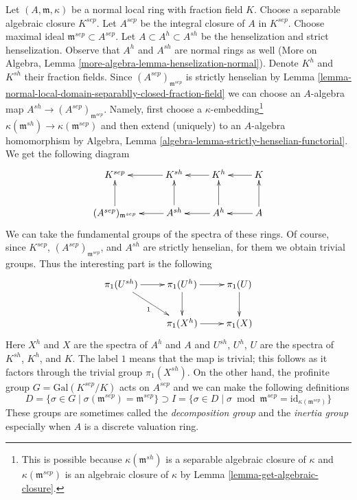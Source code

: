 \documentclass{stacks-project}
\theoremstyle{plain}
\theoremstyle{definition}
\theoremstyle{remark}
\numberwithin{equation}{subsection}
\begin{document}
\medskip\noindent
Let $(A, \mathfrak m, \kappa)$ be a normal local ring with
fraction field $K$. Choose a separable algebraic closure $K^{sep}$. Let
$A^{sep}$ be the integral closure of $A$ in $K^{sep}$.
Choose maximal ideal $\mathfrak m^{sep} \subset A^{sep}$.
Let $A \subset A^h \subset A^{sh}$ be the henselization and strict
henselization. Observe that $A^h$ and $A^{sh}$ are normal rings as well
(More on Algebra, Lemma \ref{more-algebra-lemma-henselization-normal}).
Denote $K^h$ and $K^{sh}$ their fraction fields.
Since $(A^{sep})_{\mathfrak m^{sep}}$ is strictly henselian by
Lemma \ref{lemma-normal-local-domain-separablly-closed-fraction-field}
we can choose an $A$-algebra map $A^{sh} \to (A^{sep})_{\mathfrak m^{sep}}$.
Namely, first choose a $\kappa$-embedding\footnote{This is possible
because $\kappa(\mathfrak m^{sh})$ is a separable algebraic closure
of $\kappa$ and $\kappa(\mathfrak m^{sep})$ is an algebraic closure
of $\kappa$ by Lemma \ref{lemma-get-algebraic-closure}.}
$\kappa(\mathfrak m^{sh}) \to \kappa(\mathfrak m^{sep})$ and
then extend (uniquely) to an $A$-algebra homomorphism by
Algebra, Lemma \ref{algebra-lemma-strictly-henselian-functorial}.
We get the following diagram
$$
\xymatrix{
K^{sep} & K^{sh} \ar[l] & K^h \ar[l] & K \ar[l] \\
(A^{sep})_{\mathfrak m^{sep}} \ar[u] &
A^{sh} \ar[u] \ar[l] &
A^h \ar[u] \ar[l] &
A \ar[u] \ar[l]
}
$$
We can take the fundamental groups of the spectra of these rings.
Of course, since $K^{sep}$, $(A^{sep})_{\mathfrak m^{sep}}$, and
$A^{sh}$ are strictly henselian, for them we obtain trivial groups.
Thus the interesting part is the following
\begin{equation}
\label{equation-inertia-diagram-pione}
\vcenter{
\xymatrix{
\pi_1(U^{sh}) \ar[r] \ar[rd]_1 & \pi_1(U^h) \ar[d] \ar[r] & \pi_1(U) \ar[d] \\
& \pi_1(X^h) \ar[r] & \pi_1(X)
}
}
\end{equation}
Here $X^h$ and $X$ are the spectra of $A^h$ and $A$ and
$U^{sh}$, $U^h$, $U$ are the spectra of $K^{sh}$, $K^h$, and $K$.
The label $1$ means that the map is trivial; this follows
as it factors through the trivial group $\pi_1(X^{sh})$.
On the other hand, the profinite group $G = \text{Gal}(K^{sep}/K)$
acts on $A^{sep}$ and we can make the following definitions
$$
D = \{\sigma \in G \mid \sigma(\mathfrak m^{sep}) = \mathfrak m^{sep}\}
\supset
I = \{\sigma \in D \mid \sigma \bmod \mathfrak m^{sep} =
\text{id}_{\kappa(\mathfrak m^{sep})}\}
$$
These groups are sometimes called the
{\it decomposition group} and the {\it inertia group}
especially when $A$ is a discrete valuation ring.
\end{document}
